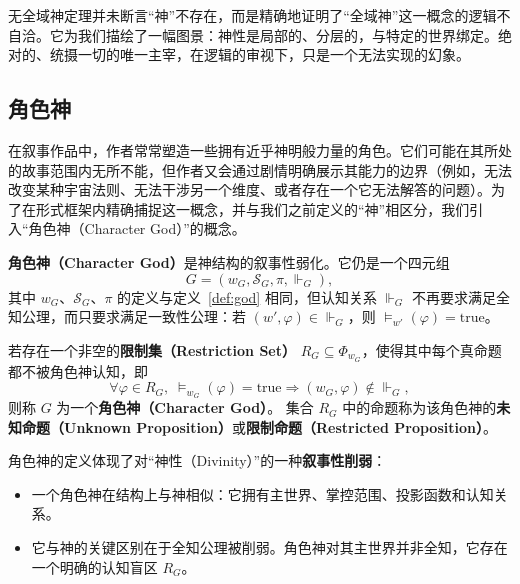 无全域神定理并未断言“神”不存在，而是精确地证明了“全域神”这一概念的逻辑不自洽。它为我们描绘了一幅图景：神性是局部的、分层的，与特定的世界绑定。绝对的、统摄一切的唯一主宰，在逻辑的审视下，只是一个无法实现的幻象。


\subsection{角色神}\label{subsec:character-god}

在叙事作品中，作者常常塑造一些拥有近乎神明般力量的角色。它们可能在其所处的故事范围内无所不能，但作者又会通过剧情明确展示其能力的边界（例如，无法改变某种宇宙法则、无法干涉另一个维度、或者存在一个它无法解答的问题）。为了在形式框架内精确捕捉这一概念，并与我们之前定义的“神”相区分，我们引入“角色神（Character God）”的概念。

\begin{definition}\label{def:character-god}
    \textbf{角色神（Character God）}是神结构的叙事性弱化。它仍是一个四元组
    \begin{equation}
        G = (w_G, \mathcal{S}_G, \pi, \Vdash_G),
    \end{equation}
    其中 \(w_G\)、\(\mathcal{S}_G\)、\(\pi\) 的定义与定义~\ref{def:god} 相同，但认知关系 \(\Vdash_G\) 不再要求满足全知公理，而只要求满足一致性公理：若 \((w',\varphi)\in\Vdash_G\)，则 \(\models_{w'}(\varphi)=\text{true}\)。

    若存在一个非空的\textbf{限制集（Restriction Set）} \( R_G \subseteq \Phi_{w_G} \)，使得其中每个真命题都不被角色神认知，即
    \begin{equation}
        \forall \varphi \in R_G,\; \models_{w_G}(\varphi)=\text{true}\Rightarrow (w_G, \varphi) \notin \Vdash_G,
    \end{equation}
    则称 \( G \) 为一个\textbf{角色神（Character God）}。
    集合 \( R_G \) 中的命题称为该角色神的\textbf{未知命题（Unknown Proposition）}或\textbf{限制命题（Restricted Proposition）}。
\end{definition}

\begin{remark}
    角色神的定义体现了对“神性（Divinity）”的一种\textbf{叙事性削弱}：
    \begin{itemize}
        \item 一个角色神在结构上与神相似：它拥有主世界、掌控范围、投影函数和认知关系。
        \item 它与神的关键区别在于全知公理被削弱。角色神对其主世界并非全知，它存在一个明确的认知盲区 \( R_G \)。
    \end{itemize}
\end{remark}

